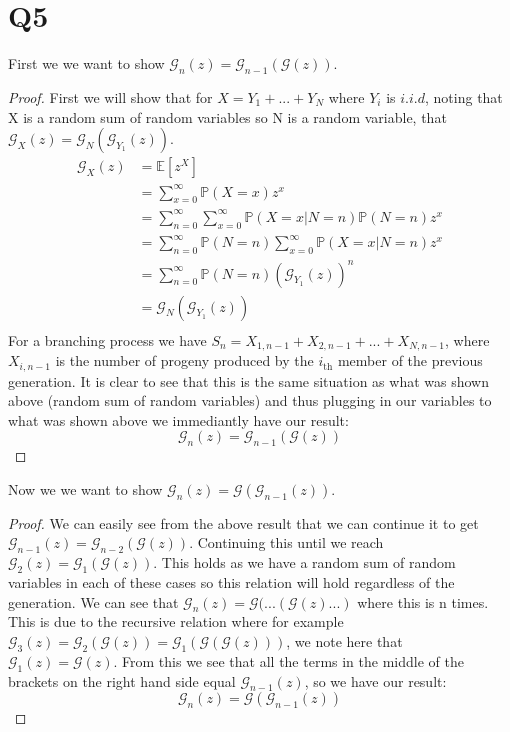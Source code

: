 \documentclass{article}
\begin{document}
\section*{Q5}
First we we want to show $\mathcal{G}_n(z)=\mathcal{G}_{n-1}(\mathcal{G}(z))$.
\begin{proof}
First we will show that for $X=Y_1+...+Y_N$ where $Y_i$ is $i.i.d$, noting that X is a random sum of random variables so N is a random variable, that $\mathcal{G}_X(z)=\mathcal{G}_N(\mathcal{G}_{Y_1}(z))$.
\begin{align*}
\mathcal{G}_X(z)&=\mathbb{E}[z^X]\\
&=\sum_{x=0}^{\infty}\mathbb{P}(X=x)z^x\\
&=\sum_{n=0}^{\infty}\sum_{x=0}^{\infty}\mathbb{P}(X=x|N=n)\mathbb{P}(N=n)z^x\\
&=\sum_{n=0}^{\infty}\mathbb{P}(N=n)\sum_{x=0}^{\infty}\mathbb{P}(X=x|N=n)z^x\\
&=\sum_{n=0}^{\infty}\mathbb{P}(N=n)(\mathcal{G}_{Y_1}(z))^n\\
&=\mathcal{G}_N(\mathcal{G}_{Y_1}(z))\\
\end{align*}
For a branching process we have $S_n=X_{1,n-1}+X_{2,n-1}+...+X_{N,n-1}$, where $X_{i,n-1}$ is the number of progeny produced by the $i_{\text{th}}$ member of the previous generation. It is clear to see that this is the same situation as what was shown above (random sum of random variables) and thus plugging in our variables to what was shown above we immediantly have our result:
$$\mathcal{G}_n(z)=\mathcal{G}_{n-1}(\mathcal{G}(z))$$
\end{proof}
\noindent Now we we want to show $\mathcal{G}_n(z)=\mathcal{G}(\mathcal{G}_{n-1}(z))$.
\begin{proof}
We can easily see from the above result that we can continue it to get $\mathcal{G}_{n-1}(z)=\mathcal{G}_{n-2}(\mathcal{G}(z))$. Continuing this until we reach $\mathcal{G}_2(z)=\mathcal{G}_{1}(\mathcal{G}(z))$. This holds as we have a random sum of random variables in each of these cases so this relation will hold regardless of the generation. We can see that $\mathcal{G}_n(z)=\mathcal{G}(...(\mathcal{G}(z)...)$ where this is n times. This is due to the recursive relation where for example $\mathcal{G}_3(z)=\mathcal{G}_{2}(\mathcal{G}(z))=\mathcal{G}_{1}(\mathcal{G}(\mathcal{G}(z)))$, we note here that $\mathcal{G}_1(z)=\mathcal{G}(z)$. From this we see that all the terms in the middle of the brackets on the right hand side equal $\mathcal{G}_{n-1}(z)$, so we have our result:
$$\mathcal{G}_n(z)=\mathcal{G}(\mathcal{G}_{n-1}(z))$$
\end{proof}
\end{document}
